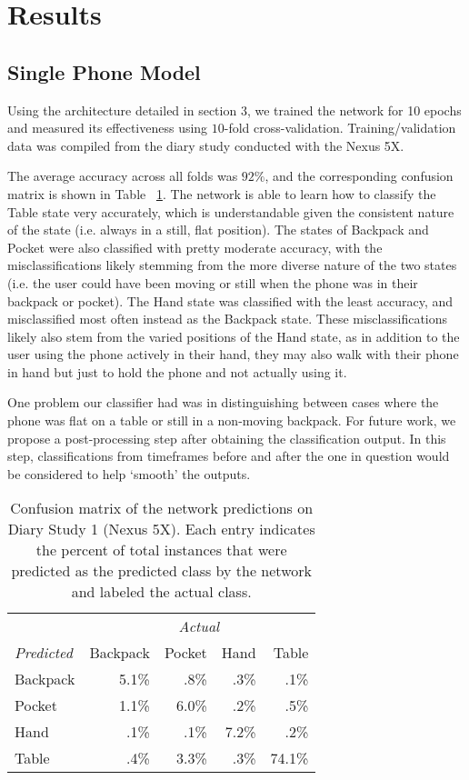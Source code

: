 \section{Results}
\subsection{Single Phone Model}
Using the architecture detailed in section 3, we trained the network for 10 epochs
and measured its effectiveness using $10$-fold cross-validation.
Training/validation data was compiled from the diary study conducted with the Nexus 5X.

The average accuracy across all folds was $92\%$, and the corresponding
confusion matrix is shown in Table ~\ref{fig:confusion1}.
 The network is able to learn how to  classify the Table state very accurately, which is understandable given  the consistent nature of the state (i.e. always in a still, flat position). 
The states of Backpack and Pocket were also classified with pretty moderate accuracy,
with the misclassifications likely stemming from the more diverse nature of 
the two states (i.e. the user could have been moving or still when the phone was
in their backpack or pocket). 
The Hand state was classified with the least accuracy,
and misclassified most often instead as the Backpack state. 
These misclassifications likely also stem from the varied positions of the Hand state, 
 as in addition to the user using the phone actively in their hand, 
 they may also walk with their phone in hand
 but just to hold the phone and not actually using it.
 
One problem our classifier had was in distinguishing between cases where the phone was flat on a table or still in a non-moving backpack.
For future work, we propose a post-processing step after obtaining the classification output.
In this step, classifications from timeframes before and after the one in question would be considered to help `smooth' the outputs.

\begin{table}[h]
\caption{Confusion matrix of the network predictions on Diary Study 1 (Nexus 5X). Each entry indicates the percent of
total instances that were predicted as the predicted class by the network and labeled the actual class.}\label{fig:confusion1} \centering
\begin{tabular}{ l rrrr }  
\toprule
      &  \multicolumn{4}{c}{\textit{Actual}} \\
\cmidrule{2-5}
\textit{Predicted}		&	Backpack    & 	Pocket 	& 	Hand	&	Table \\
\midrule
Backpack			&	5.1\% 	&	 .8\%		&	.3\% 	&	.1\% \\
Pocket			&	1.1\% 	&	6.0\% 	&	 .2\% 	&	 .5\% \\
Hand			&	.1\% 	&	 .1\% 	&	7.2\% 	&	 .2\% \\
Table			&	 .4\% 	&	 3.3\% 	&	 .3\% 	&	74.1\%\\
\bottomrule
\end{tabular}
\end{table}


